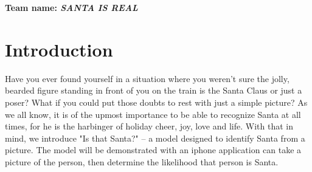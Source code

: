 \textbf{Team name: \emph{SANTA IS REAL}}


\section*{Introduction}
Have you ever found yourself in a situation where you weren't sure the jolly, bearded figure standing in front of you on the train
is the Santa Claus or just a poser? What if you could put those doubts to rest with just 
a simple picture? As we all know, it is of the upmost importance to be able to recognize Santa at all times, for he is 
the harbinger of holiday cheer, joy, love and life. With that in mind, we introduce "Is that Santa?" – a model designed to identify 
Santa from a picture. The model will be demonstrated with an iphone application can take a picture of the person, then determine 
the likelihood that person is Santa.  

